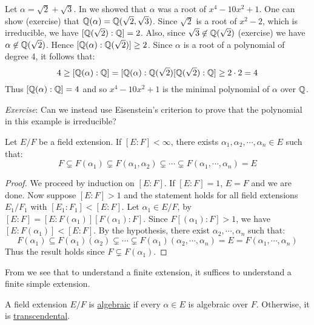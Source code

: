 \documentclass[11pt]{article}
\begin{document}
\begin{example}
    Let $\alpha=\sqrt{2}+\sqrt{3}$. In  we showed that $\alpha$ was a root of $x^4-10x^2+1$. One can show (exercise) that $\mathbb{Q}(\alpha)=\mathbb{Q}(\sqrt{2},\sqrt{3})$. Since $\sqrt{2}$ is a root of $x^2-2$, which is irreducible, we have $[\mathbb{Q}(\sqrt{2}):\mathbb{Q}]=2$. Also, since $\sqrt{3}\not\in\mathbb{Q}(\sqrt{2})$ (exercise) we have $\alpha\not\in\mathbb{Q}(\sqrt{2})$. Hence $[\mathbb{Q}(\alpha):\mathbb{Q}(\sqrt{2})]\geq2$. Since $\alpha$ is a root of a polynomial of degree 4, it follows that:
    \[4\geq[\mathbb{Q}(\alpha):\mathbb{Q}]=[\mathbb{Q}(\alpha):\mathbb{Q}(\sqrt{2})[\mathbb{Q}(\sqrt{2}):\mathbb{Q}]\geq2\cdot2=4\]
    Thus $[\mathbb{Q}(\alpha):\mathbb{Q}]=4$ and so $x^4-10x^2+1$ is the minimal polynomial of $\alpha$ over $\mathbb{Q}$.

    \emph{Exercise}: Can we instead use Eisenstein's criterion to prove that the polynomial in this example is irreducible?
\end{example}

\begin{theorem}
    Let $E/F$ be a field extension. If $[E:F]<\infty$, there exists $\alpha_1,\alpha_2,\cdots,\alpha_n\in E$ such that:
    \[F\subsetneq F(\alpha_1)\subsetneq F(\alpha_1,\alpha_2)\subsetneq\cdots\subsetneq F(\alpha_1,\cdots,\alpha_n)=E\]
\end{theorem}

\begin{proof}
    We proceed by induction on $[E:F]$. If $[E:F]=1$, $E=F$ and we are done. Now suppose $[E:F]>1$ and the statement holds for all field extensions $E_1/F_1$ with $[E_1:F_1]<[E:F]$. Let $\alpha_1\in E/F$, by  $[E:F]=[E:F(\alpha_1)][F(\alpha_1):F]$. Since $F[(\alpha_1):F]>1$, we have $[E:F(\alpha_1)]<[E:F]$. By the hypothesis, there exist $\alpha_2,\cdots,\alpha_n$ such that:
    \[F(\alpha_1)\subseteq F(\alpha_1)(\alpha_2)\subsetneq\cdots\subsetneq F(\alpha_1)(\alpha_2,\cdots,\alpha_n)=E=F(\alpha_1,\cdots,\alpha_n)\]
    Thus the result holds since $F\subsetneq F(\alpha_1)$.
    
\end{proof}

\begin{remark}
    From  we see that to understand a finite extension, it suffices to understand a finite simple extension.
\end{remark}

\begin{definition}
    A field extension $E/F$ is \ul{algebraic} if every $\alpha\in E$ is algebraic over $F$. Otherwise, it is \ul{transcendental}.
\end{definition}
\end{document}
